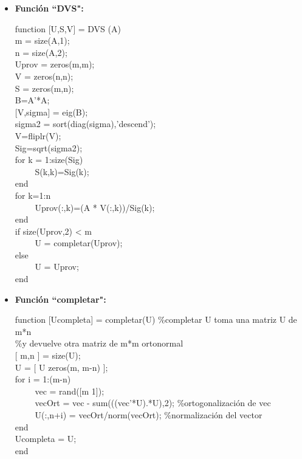 \documentclass[a4paper]{article}
\begin{document}
\begin{itemize}
 	\item \textbf{Función ``DVS":}
 		\begin{tabbing}
		function $ [ $U,S,V$ ] $ = DVS (A)\\
	  	m = size(A,1);\\
		n = size(A,2);\\
		Uprov = zeros(m,m);\\
		V = zeros(n,n);\\	
		S = zeros(m,n);\\
		B=A'*A;\\
		$ [ $V,sigma$ ] $ = eig(B);\\
		sigma2 = sort(diag(sigma),'descend');\\
		V=fliplr(V);\\
		Sig=sqrt(sigma2);\\
		for k = 1:size(Sig)\\
		~~~~ S(k,k)=Sig(k);\\
	 	end\\
		for k=1:n\\
		~~~~ Uprov(:,k)=(A * V(:,k))/Sig(k);\\
		end\\
		if size(Uprov,2) < m\\
		~~~~ U = completar(Uprov);\\
		else\\
		~~~~ U = Uprov;\\
	 	end
		\end{tabbing}
		
	\item \textbf{Función ``completar":}
 		\begin{tabbing}
 		function [Ucompleta] = completar(U)
		\%completar U toma una matriz U de m*n \\
		\%y devuelve otra matriz de m*m ortonormal\\
		$ [ $ m,n $ ] $ = size(U);\\
		U = $ [ $ U zeros(m, m-n) $ ] $;\\
		for i = 1:(m-n)\\
    	~~~~ vec = rand([m 1]);\\
    	~~~~ vecOrt = vec - sum(((vec'*U).*U),2); \%ortogonalización de vec\\
    	~~~~ U(:,n+i) = vecOrt/norm(vecOrt); \%normalización del vector\\
		end\\
		Ucompleta = U;\\
    	end
 		\end{tabbing}	
 	\end{itemize}
	
\end{document}
